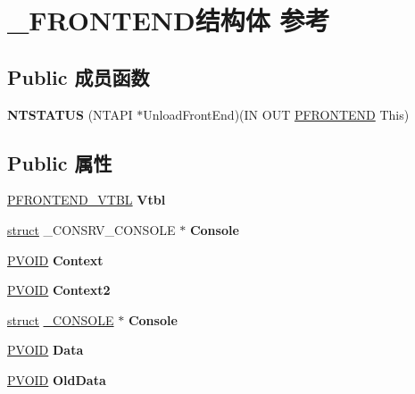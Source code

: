\hypertarget{struct___f_r_o_n_t_e_n_d}{}\section{\+\_\+\+F\+R\+O\+N\+T\+E\+N\+D结构体 参考}
\label{struct___f_r_o_n_t_e_n_d}
\subsection*{Public 成员函数}
\begin{DoxyCompactItemize}
\item 
\mbox{\label{struct___f_r_o_n_t_e_n_d_adf1f1147902699da0ea467fc59a887fc}} 
{\bfseries N\+T\+S\+T\+A\+T\+US} (N\+T\+A\+PI $\ast$Unload\+Front\+End)(IN O\+UT \hyperlink{struct___f_r_o_n_t_e_n_d}{P\+F\+R\+O\+N\+T\+E\+ND} This)
\end{DoxyCompactItemize}
\subsection*{Public 属性}
\begin{DoxyCompactItemize}
\item 
\mbox{\label{struct___f_r_o_n_t_e_n_d_a0ca7b44b01c344b912ec147a0d5ded47}} 
\hyperlink{struct___f_r_o_n_t_e_n_d___v_t_b_l}{P\+F\+R\+O\+N\+T\+E\+N\+D\+\_\+\+V\+T\+BL} {\bfseries Vtbl}
\item 
\mbox{\label{struct___f_r_o_n_t_e_n_d_a3cfeb429f0948fbb1e8c330822c1b018}} 
\hyperlink{interfacestruct}{struct} \+\_\+\+C\+O\+N\+S\+R\+V\+\_\+\+C\+O\+N\+S\+O\+LE $\ast$ {\bfseries Console}
\item 
\mbox{\label{struct___f_r_o_n_t_e_n_d_ac2f80be26e8b1ed6248fe997d4b2b277}} 
\hyperlink{interfacevoid}{P\+V\+O\+ID} {\bfseries Context}
\item 
\mbox{\label{struct___f_r_o_n_t_e_n_d_aafe60535124c135c546e893410032369}} 
\hyperlink{interfacevoid}{P\+V\+O\+ID} {\bfseries Context2}
\item 
\mbox{\label{struct___f_r_o_n_t_e_n_d_a119cf779dbf2c430e22e0f0a4e772a75}} 
\hyperlink{interfacestruct}{struct} \hyperlink{struct___c_o_n_s_o_l_e}{\+\_\+\+C\+O\+N\+S\+O\+LE} $\ast$ {\bfseries Console}
\item 
\mbox{\label{struct___f_r_o_n_t_e_n_d_ad45316b9a52e1ecfaf454de2ef336798}} 
\hyperlink{interfacevoid}{P\+V\+O\+ID} {\bfseries Data}
\item 
\mbox{\label{struct___f_r_o_n_t_e_n_d_a3310237072b54b66266ee3159db81a40}} 
\hyperlink{interfacevoid}{P\+V\+O\+ID} {\bfseries Old\+Data}
\end{DoxyCompactItemize}


